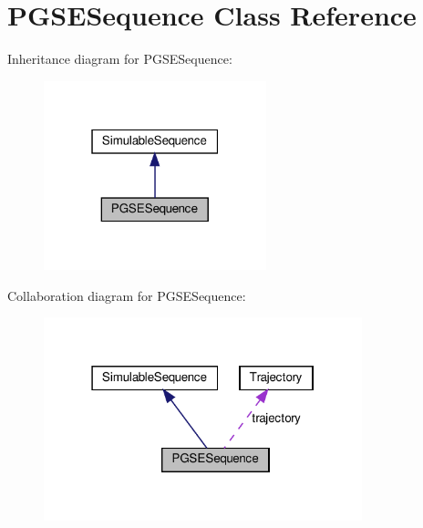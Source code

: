 \hypertarget{class_p_g_s_e_sequence}{}\section{P\+G\+S\+E\+Sequence Class Reference}
\label{class_p_g_s_e_sequence}


Inheritance diagram for P\+G\+S\+E\+Sequence\+:
\nopagebreak
\begin{figure}[H]
\begin{center}
\leavevmode
\includegraphics[width=183pt]{class_p_g_s_e_sequence__inherit__graph}
\end{center}
\end{figure}


Collaboration diagram for P\+G\+S\+E\+Sequence\+:
\nopagebreak
\begin{figure}[H]
\begin{center}
\leavevmode
\includegraphics[width=262pt]{class_p_g_s_e_sequence__coll__graph}
\end{center}
\end{figure}
